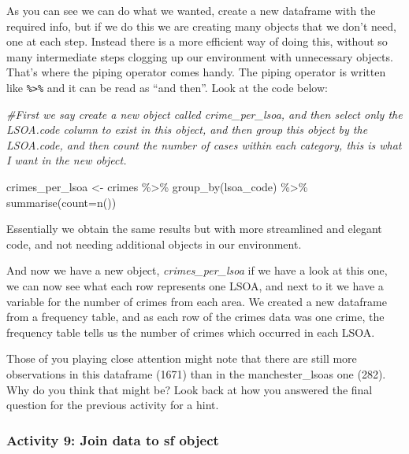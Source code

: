 \documentclass[
]{book}
\newenvironment{Shaded}{\begin{snugshade}}{\end{snugshade}}
\newcommand{\AttributeTok}[1]{\textcolor[rgb]{0.77,0.63,0.00}{#1}}
\newcommand{\CommentTok}[1]{\textcolor[rgb]{0.56,0.35,0.01}{\textit{#1}}}
\newcommand{\FunctionTok}[1]{\textcolor[rgb]{0.00,0.00,0.00}{#1}}
\newcommand{\NormalTok}[1]{#1}
\newcommand{\OtherTok}[1]{\textcolor[rgb]{0.56,0.35,0.01}{#1}}
\newcommand{\SpecialCharTok}[1]{\textcolor[rgb]{0.00,0.00,0.00}{#1}}
\begin{document}
As you can see we can do what we wanted, create a new dataframe with the required info, but if we do this we are creating many objects that we don't need, one at each step. Instead there is a more efficient way of doing this, without so many intermediate steps clogging up our environment with unnecessary objects. That's where the piping operator comes handy. The piping operator is written like \texttt{\%\textgreater{}\%} and it can be read as ``and then''. Look at the code below:

\begin{Shaded}
\begin{Highlighting}[]
\CommentTok{\#First we say create a new object called crime\_per\_lsoa, and then select only the LSOA.code column to exist in this object, and then group this object by the LSOA.code, and then count the number of cases within each category, this is what I want in the new object.}

\NormalTok{crimes\_per\_lsoa }\OtherTok{\textless{}{-}}\NormalTok{ crimes }\SpecialCharTok{\%\textgreater{}\%}
  \FunctionTok{group\_by}\NormalTok{(lsoa\_code) }\SpecialCharTok{\%\textgreater{}\%}
  \FunctionTok{summarise}\NormalTok{(}\AttributeTok{count=}\FunctionTok{n}\NormalTok{())}
\end{Highlighting}
\end{Shaded}

Essentially we obtain the same results but with more streamlined and elegant code, and not needing additional objects in our environment.

And now we have a new object, \emph{crimes\_per\_lsoa} if we have a look at this one, we can now see what each row represents one LSOA, and next to it we have a variable for the number of crimes from each area. We created a new dataframe from a frequency table, and as each row of the crimes data was one crime, the frequency table tells us the number of crimes which occurred in each LSOA.

Those of you playing close attention might note that there are still more observations in this dataframe (1671) than in the manchester\_lsoas one (282). Why do you think that might be? Look back at how you answered the final question for the previous activity for a hint.

\hypertarget{activity-9-join-data-to-sf-object}{%
\subsubsection{Activity 9: Join data to sf object}\label{activity-9-join-data-to-sf-object}}
\end{document}
